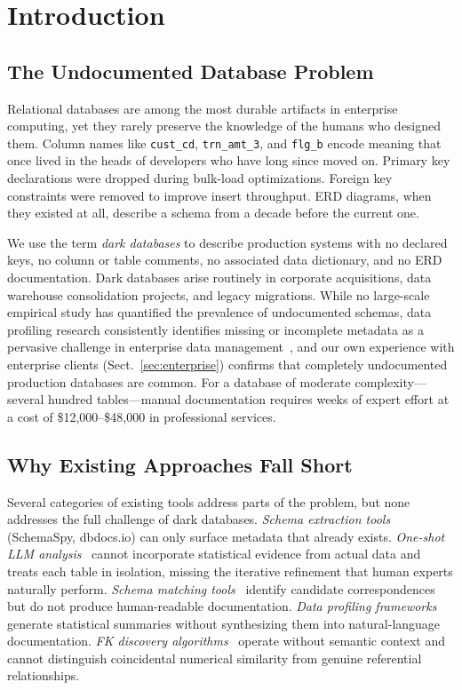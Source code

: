 \documentclass[twocolumn]{svjour3}
\begin{document}
\section{Introduction}

\subsection{The Undocumented Database Problem}

Relational databases are among the most durable artifacts in enterprise computing, yet they rarely preserve the knowledge of the humans who designed them. Column names like \texttt{cust\_cd}, \texttt{trn\_amt\_3}, and \texttt{flg\_b} encode meaning that once lived in the heads of developers who have long since moved on. Primary key declarations were dropped during bulk-load optimizations. Foreign key constraints were removed to improve insert throughput. ERD diagrams, when they existed at all, describe a schema from a decade before the current one.

We use the term \emph{dark databases} to describe production systems with no declared keys, no column or table comments, no associated data dictionary, and no ERD documentation. Dark databases arise routinely in corporate acquisitions, data warehouse consolidation projects, and legacy migrations. While no large-scale empirical study has quantified the prevalence of undocumented schemas, data profiling research consistently identifies missing or incomplete metadata as a pervasive challenge in enterprise data management~\cite{abedjan2015profiling}, and our own experience with enterprise clients (Sect.~\ref{sec:enterprise}) confirms that completely undocumented production databases are common. For a database of moderate complexity---several hundred tables---manual documentation requires weeks of expert effort at a cost of \$12,000--\$48,000 in professional services.

\subsection{Why Existing Approaches Fall Short}

Several categories of existing tools address parts of the problem, but none addresses the full challenge of dark databases. \emph{Schema extraction tools} (SchemaSpy, dbdocs.io) can only surface metadata that already exists. \emph{One-shot LLM analysis}~\cite{trummer2024succinct} cannot incorporate statistical evidence from actual data and treats each table in isolation, missing the iterative refinement that human experts naturally perform. \emph{Schema matching tools}~\cite{rahm2001survey} identify candidate correspondences but do not produce human-readable documentation. \emph{Data profiling frameworks}~\cite{abedjan2015profiling} generate statistical summaries without synthesizing them into natural-language documentation. \emph{FK discovery algorithms}~\cite{rostin2009fk,jiang2020holistic} operate without semantic context and cannot distinguish coincidental numerical similarity from genuine referential relationships.
\end{document}
